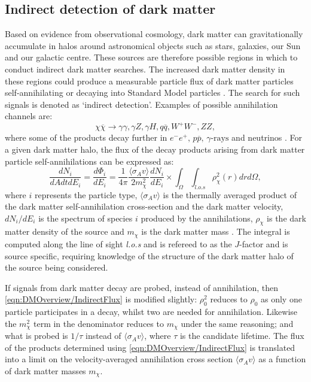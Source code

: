 \subsection{Indirect detection of dark matter}\label{sec:DMOverview/IndirectDM}
Based on evidence from observational cosmology, dark matter can gravitationally accumulate in halos around astronomical objects such as stars, galaxies, our Sun and our galactic centre. These sources are therefore possible regions in which to conduct indirect dark matter searches. The increased dark matter density in these regions could produce a measurable particle flux of dark matter particles self-annihilating or decaying into Standard Model particles \cite{Strigari:2012acq}. The search for such signals is denoted as `indirect detection'. Examples of possible annihilation channels are:
\begin{equation}
    \chi\overline{\chi}\rightarrow\gamma\gamma,\gamma Z,\gamma H,q\overline{q},W^+W^-,ZZ,
\end{equation}
where some of the products decay further in $e^-e^+,\,p\overline{p},\,\gamma\text{-rays}$ and neutrinos \cite{DirectDetection2015}. For a given dark matter halo, the flux of the decay products arising from dark matter particle self-annihilations can be expressed as:
\begin{equation}\label{eqn:DMOverview/IndirectFlux}
    \frac{dN_i}{dAdtdE_i}=\frac{d\Phi_i}{dE_i}=\frac{1}{4\pi}\frac{\langle\sigma_Av\rangle}{2m^2_\chi}\frac{dN_i}{dE_i}\times\int_\Omega\int_{l.o.s}\rho^2_\chi(r)drd\Omega,
\end{equation}
where $i$ represents the particle type, $\langle\sigma_Av\rangle$ is the thermally averaged product of the dark matter self-annihilation cross-section and the dark matter velocity, $dN_i/dE_i$ is the spectrum of species $i$ produced by the annihilations, $\rho_\chi$ is the dark matter density of the source and $m_\chi$ is the dark matter mass \cite{PerezdelosHeros:2020qyt}. The integral is computed along the line of sight \textit{l.o.s} and is refereed to as the $J$-factor and is source specific, requiring knowledge of the structure of the dark matter halo of the source being considered.

If signals from dark matter decay are probed, instead of annihilation, then \autoref{eqn:DMOverview/IndirectFlux} is modified slightly: $\rho_0^2$ reduces to $\rho_0$ as only one particle participates in a decay, whilst two are needed for annihilation. Likewise the $m_\chi^2$ term in the denominator reduces to $m_\chi$ under the same reasoning; and what is probed is $1/\tau$ instead of $\langle\sigma_Av\rangle$, where $\tau$ is the candidate lifetime.
The flux of the products determined using \autoref{eqn:DMOverview/IndirectFlux} is translated into a limit on the velocity-averaged annihilation cross section $\langle\sigma_Av\rangle$ as a function of dark matter masses $m_\chi$. 

